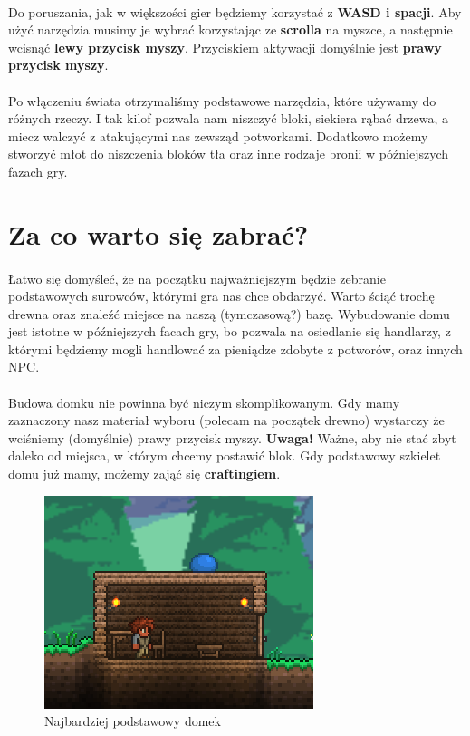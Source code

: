 \documentclass{report}
\begin{document}
\paragraph{} Do poruszania, jak w większości gier będziemy korzystać z \textbf{WASD i spacji}. Aby użyć narzędzia musimy je wybrać korzystając ze \textbf{scrolla} na myszce, a następnie wcisnąć \textbf{lewy przycisk myszy}. Przyciskiem aktywacji domyślnie jest \textbf{prawy przycisk myszy}.
\paragraph{}Po włączeniu świata otrzymaliśmy podstawowe narzędzia, które używamy do różnych rzeczy. I tak kilof pozwala nam niszczyć bloki, siekiera rąbać drzewa, a miecz walczyć z atakującymi nas zewsząd potworkami. Dodatkowo możemy stworzyć młot do niszczenia bloków tła oraz inne rodzaje bronii w późniejszych fazach gry.
\section{Za co warto się zabrać?}
\paragraph{} Łatwo się domyśleć, że na początku najważniejszym będzie zebranie podstawowych surowców, którymi gra nas chce obdarzyć. Warto ściąć trochę drewna oraz znaleźć miejsce na naszą (tymczasową?) bazę. Wybudowanie domu jest istotne w późniejszych facach gry, bo pozwala na osiedlanie się handlarzy, z którymi będziemy mogli handlować za pieniądze zdobyte z potworów, oraz innych NPC.
\paragraph{} Budowa domku nie powinna być niczym skomplikowanym. Gdy mamy zaznaczony nasz materiał wyboru (polecam na początek drewno) wystarczy że wciśniemy (domyślnie) prawy przycisk myszy. \textbf{Uwaga!} Ważne, aby nie stać zbyt daleko od miejsca, w którym chcemy postawić blok. Gdy podstawowy szkielet domu już mamy, możemy zająć się \textbf{craftingiem}.
\begin{figure}
	\centering
	\includegraphics{house}
	\caption{Najbardziej podstawowy domek}
	\label{rys:house}
\end{figure}
\end{document}
